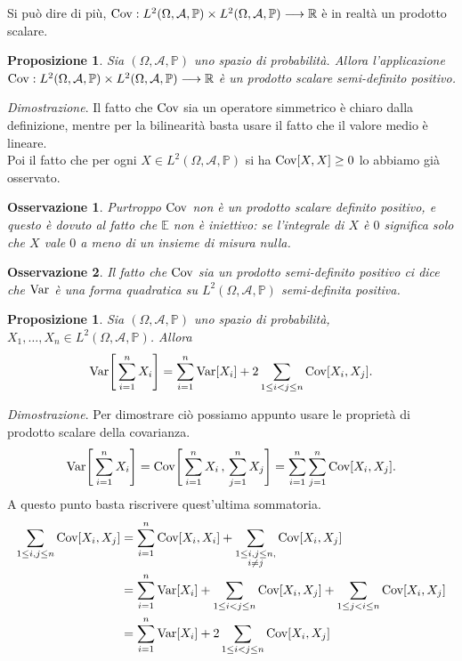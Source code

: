 \documentclass[11pt]{book}
\makeatletter
\theoremstyle{Definizione}
\theoremstyle{TeoremaProposizioneLemmaCorollario}
\newtheorem{mypropo}[myteo]{Proposizione}
\theoremstyle{OsservazioneNota}
\newtheorem{myobs}{Osservazione}[section]
\renewenvironment{proof}[1][\proofname]{\par
  \normalfont \topsep6\p@\@plus6\p@\relax
  \trivlist
  \item[\hskip\labelsep
        \itshape
    #1\@addpunct{.}]\ignorespaces
}{%
  \endtrivlist\@endpefalse
}
\newcommand{\R}{\mathbb{R}}
\renewcommand{\P}{\mathbb{P}}
\newcommand{\E}{\mathbb{E}}
\newcommand{\Cov}{\textup{Cov}}
\newcommand{\Var}{\textup{Var}}
\renewenvironment{proof}{\textsl{Dimostrazione}.}{}
\makeatother
\begin{document}
Si può dire di più, $\Cov:L^2(\Omega,\mathcal{A},\P) \times L^2(\Omega,\mathcal{A},\P) \longrightarrow \R$ è in realtà un prodotto scalare.
\begin{boxpro}
\begin{mypropo}
Sia $(\Omega,\mathcal{A},\P)$ uno spazio di probabilità. Allora l'applicazione $\Cov:L^2(\Omega,\mathcal{A},\P)\times L^2(\Omega,\mathcal{A},\P) \longrightarrow \R$ è un prodotto scalare semi-definito positivo.
\end{mypropo}
\tcblower
\begin{proof}
Il fatto che $\Cov$ sia un operatore simmetrico è chiaro dalla definizione, mentre per la bilinearità basta usare il fatto che il valore medio è lineare.\\
Poi il fatto che per ogni $X\in L^2(\Omega,\mathcal{A},\P)$ si ha $\Cov[X,X] \geq 0$ lo abbiamo già osservato.
\end{proof}
\end{boxpro}
\begin{myobs}
Purtroppo $\Cov$ non è un prodotto scalare definito positivo, e questo è dovuto al fatto che $\E$ non è iniettivo: se l'integrale di $X$ è $0$ significa solo che $X$ vale $0$ a meno di un insieme di misura nulla.
\end{myobs}
\begin{myobs}
Il fatto che $\Cov$ sia un prodotto semi-definito positivo ci dice che $\Var$ è una forma quadratica su $L^2(\Omega,\mathcal{A},\P)$ semi-definita positiva.
\end{myobs}
\begin{boxpro}
\begin{mypropo}\label{pro:VarianzaDellaSomma}
Sia $(\Omega,\mathcal{A},\P)$ uno spazio di probabilità, $X_1,\dots,X_n\in L^2(\Omega,\mathcal{A},\P)$. Allora
$$
\Var\Bigg[\sum_{i = 1}^n X_i\Bigg] = \sum_{i = 1}^n \Var[X_i] + 2\sum_{1\leq i < j \leq n} \Cov[X_i,X_j].
$$
\end{mypropo}
\tcblower
\begin{proof}
Per dimostrare ciò possiamo appunto usare le proprietà di prodotto scalare della covarianza.
$$
\Var\Bigg[\sum_{i = 1}^n X_i\Bigg] = \Cov\Bigg[\sum_{i = 1}^n X_i\, ,\, \sum_{j = 1}^n X_j\Bigg] = \sum_{i = 1}^n \sum_{j = 1}^n \Cov[X_i,X_j].
$$
A questo punto basta riscrivere quest'ultima sommatoria.
\begin{align*}
\sum_{1\leq i,j\leq n} \Cov[X_i,X_j] &= \sum_{i = 1}^n \Cov[X_i,X_i] + \sum_{\substack{1\leq i,j\leq n, \\ i \neq j}} \Cov[X_i,X_j]\\
&= \sum_{i = 1}^n \Var[X_i] + \sum_{1\leq i < j \leq n} \Cov[X_i,X_j] + \sum_{1 \leq j < i \leq n} \Cov[X_i,X_j]\\
&= \sum_{i = 1}^n \Var[X_i] + 2 \sum_{1 \leq i < j \leq n} \Cov[X_i,X_j]
\end{align*}
\end{proof}
\end{boxpro}
\end{document}
